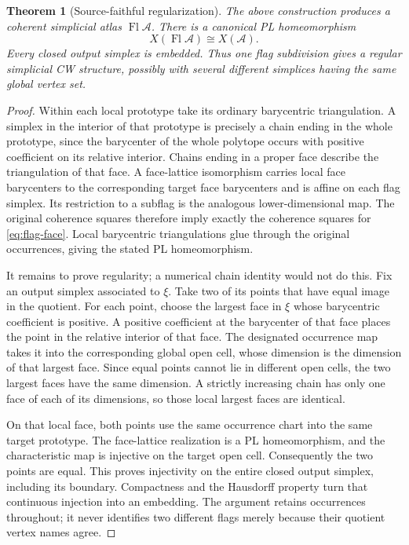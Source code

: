\documentclass[11pt]{article}
\newtheorem{theorem}{Theorem}[section]
\theoremstyle{definition}\newtheorem{definition}[theorem]{Definition}
\theoremstyle{remark}\newtheorem{remark}[theorem]{Remark}
\newcommand{\Flag}{\operatorname{Fl}}
\newcommand{\Atlas}{\mathcal A}
\begin{document}
\begin{theorem}[Source-faithful regularization]\label{thm:regular}
The above construction produces a coherent simplicial atlas \(\Flag\Atlas\). There is a canonical PL homeomorphism
\[
                       X(\Flag\Atlas)\cong X(\Atlas).
\]
Every closed output simplex is embedded. Thus one flag subdivision gives a regular simplicial CW structure, possibly with several different simplices having the same global vertex set.
\end{theorem}
\begin{proof}
Within each local prototype take its ordinary barycentric triangulation. A simplex in the interior of that prototype is precisely a chain ending in the whole prototype, since the barycenter of the whole polytope occurs with positive coefficient on its relative interior. Chains ending in a proper face describe the triangulation of that face. A face-lattice isomorphism carries local face barycenters to the corresponding target face barycenters and is affine on each flag simplex. Its restriction to a subflag is the analogous lower-dimensional map. The original coherence squares therefore imply exactly the coherence squares for \eqref{eq:flag-face}. Local barycentric triangulations glue through the original occurrences, giving the stated PL homeomorphism.

It remains to prove regularity; a numerical chain identity would not do this. Fix an output simplex associated to \(\xi\). Take two of its points that have equal image in the quotient. For each point, choose the largest face in \(\xi\) whose barycentric coefficient is positive. A positive coefficient at the barycenter of that face places the point in the relative interior of that face. The designated occurrence map takes it into the corresponding global open cell, whose dimension is the dimension of that largest face. Since equal points cannot lie in different open cells, the two largest faces have the same dimension. A strictly increasing chain has only one face of each of its dimensions, so those local largest faces are identical.

On that local face, both points use the same occurrence chart into the same target prototype. The face-lattice realization is a PL homeomorphism, and the characteristic map is injective on the target open cell. Consequently the two points are equal. This proves injectivity on the entire closed output simplex, including its boundary. Compactness and the Hausdorff property turn that continuous injection into an embedding. The argument retains occurrences throughout; it never identifies two different flags merely because their quotient vertex names agree.
\end{proof}
\end{document}

